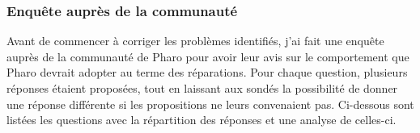 
\subsubsection{Enquête auprès de la communauté}
Avant de commencer à corriger les problèmes identifiés, j'ai fait une enquête auprès de la communauté de Pharo pour avoir leur avis sur le comportement que Pharo devrait adopter au terme des réparations. Pour chaque question, plusieurs réponses étaient proposées, tout en laissant aux sondés la possibilité de donner une réponse différente si les propositions ne leurs convenaient pas. Ci-dessous sont listées les questions avec la répartition des réponses et une analyse de celles-ci.







